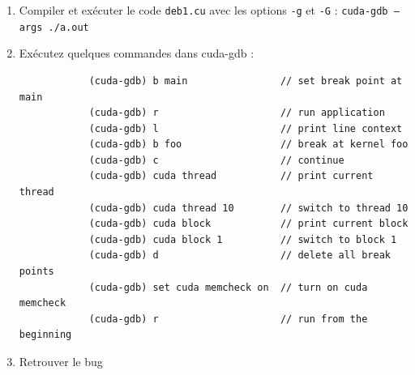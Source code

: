 \begin{wtodo}[Test]{}

	\begin{enumerate}
		\item  Compiler et exécuter le code {\tt deb1.cu} avec les options {\tt -g} et {\tt -G} : {\tt cuda-gdb --args ./a.out}
		\item Exécutez quelques commandes dans cuda-gdb :
		\begin{verbatim}
			(cuda-gdb) b main                // set break point at main
			(cuda-gdb) r                     // run application
			(cuda-gdb) l                     // print line context 
			(cuda-gdb) b foo                 // break at kernel foo
			(cuda-gdb) c                     // continue
			(cuda-gdb) cuda thread           // print current thread
			(cuda-gdb) cuda thread 10        // switch to thread 10
			(cuda-gdb) cuda block            // print current block
			(cuda-gdb) cuda block 1          // switch to block 1
			(cuda-gdb) d                     // delete all break points
			(cuda-gdb) set cuda memcheck on  // turn on cuda memcheck
			(cuda-gdb) r                     // run from the beginning
		\end{verbatim}
		\item Retrouver le bug
	\end{enumerate}

\end{wtodo}



